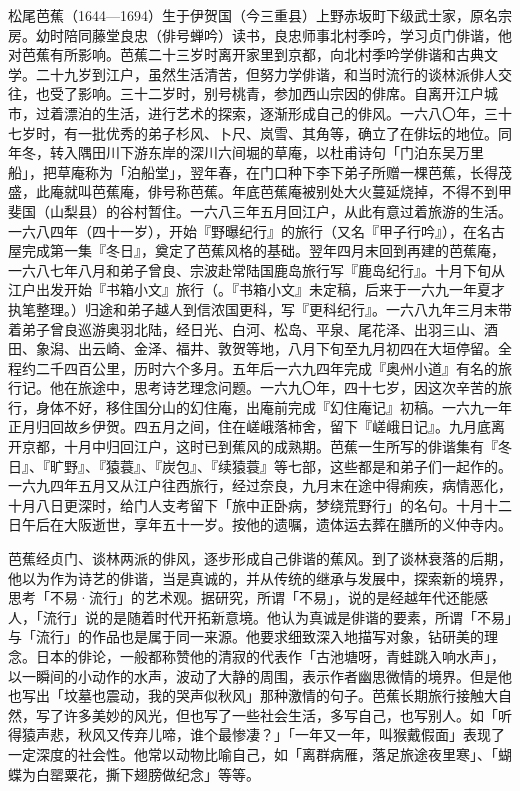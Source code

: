 {\FS
    松尾芭蕉（1644—1694）生于伊贺国（今三重县）上野赤坂町下级武士家，原名宗房。幼时陪同藤堂良忠（俳号蝉吟）读书，良忠师事北村季吟，学习贞门俳谐，他对芭蕉有所影响。芭蕉二十三岁时离开家里到京都，向北村季吟学俳谐和古典文学。二十九岁到江户，虽然生活清苦，但努力学俳谐，和当时流行的谈林派俳人交往，也受了影响。三十二岁时，别号桃青，参加西山宗因的俳席。自离开江户城市，过着漂泊的生活，进行艺术的探索，逐渐形成自己的俳风。一六八〇年，三十七岁时，有一批优秀的弟子杉风、卜尺、岚雪、其角等，确立了在俳坛的地位。同年冬，转入隅田川下游东岸的深川六间堀的草庵，以杜甫诗句「门泊东吴万里船」，把草庵称为「泊船堂」，翌年春，在门口种下李下弟子所赠一棵芭蕉，长得茂盛，此庵就叫芭蕉庵，俳号称芭蕉。年底芭蕉庵被别处大火蔓延烧掉，不得不到甲斐国（山梨县）的谷村暂住。一六八三年五月回江户，从此有意过着旅游的生活。一六八四年（四十一岁），开始『野曝纪行』的旅行（又名『甲子行吟』），在名古屋完成第一集『冬日』，奠定了芭蕉风格的基础。翌年四月末回到再建的芭蕉庵，一六八七年八月和弟子曾良、宗波赴常陆国鹿岛旅行写『鹿岛纪行』。十月下旬从江户出发开始『书箱小文』旅行（。『书箱小文』未定稿，后来于一六九一年夏才执笔整理。）归途和弟子越人到信浓国更科，写『更科纪行』。一六八九年三月末带着弟子曾良巡游奥羽北陆，经日光、白河、松岛、平泉、尾花泽、出羽三山、酒田、象潟、出云崎、金泽、福井、敦贺等地，八月下旬至九月初四在大垣停留。全程约二千四百公里，历时六个多月。五年后一六九四年完成『奥州小道』有名的旅行记。他在旅途中，思考诗艺理念问题。一六九〇年，四十七岁，因这次辛苦的旅行，身体不好，移住国分山的幻住庵，出庵前完成『幻住庵记』初稿。一六九一年正月归回故乡伊贺。四五月之间，住在嵯峨落柿舍，留下『嵯峨日记』。九月底离开京都，十月中归回江户，这时已到蕉风的成熟期。芭蕉一生所写的俳谐集有『冬日』、『旷野』、『猿蓑』、『炭包』、『续猿蓑』等七部，这些都是和弟子们一起作的。一六九四年五月又从江户往西旅行，经过奈良，九月末在途中得痢疾，病情恶化，十月八日更深时，给门人支考留下「旅中正卧病，梦绕荒野行」的名句。十月十二日午后在大阪逝世，享年五十一岁。按他的遗嘱，遗体运去葬在膳所的义仲寺内。

    芭蕉经贞门\footnotemark[1]、谈林\footnotemark[2]两派的俳风，逐步形成自己俳谐的蕉风。到了谈林衰落的后期，他以为作为诗艺的俳谐，当是真诚的，并从传统的继承与发展中，探索新的境界，思考「不易·流行」的艺术观。据研究，所谓「不易」，说的是经越年代还能感人，「流行」说的是随着时代开拓新意境。他认为真诚是俳谐的要素，所谓「不易」与「流行」的作品也是属于同一来源。他要求细致深入地描写对象，钻研美的理念。日本的俳论，一般都称赞他的清寂的代表作「古池塘呀，青蛙跳入响水声」，以一瞬间的小动作的水声，波动了大静的周围，表示作者幽思微情的境界。但是他也写出「坟墓也震动，我的哭声似秋风」那种激情的句子。芭蕉长期旅行接触大自然，写了许多美妙的风光，但也写了一些社会生活，多写自己，也写别人。如「听得猿声悲，秋风又传弃儿啼，谁个最惨凄？」「一年又一年，叫猴戴假面」表现了一定深度的社会性。他常以动物比喻自己，如「离群病雁，落足旅途夜里寒」、「蝴蝶为白罂粟花，撕下翅膀做纪念」等等。

}
